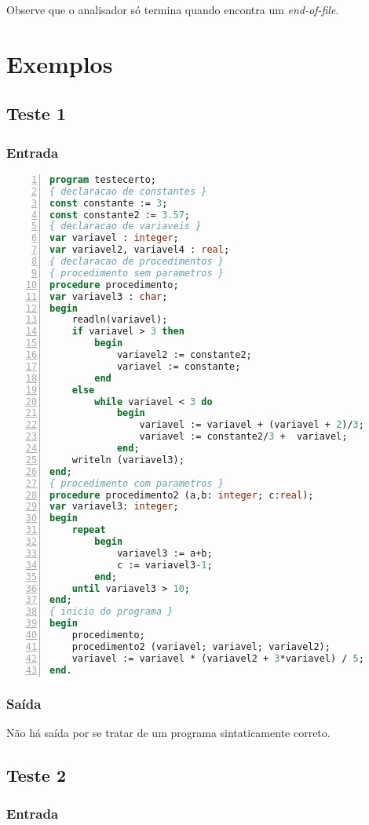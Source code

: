 \documentclass {article}
\begin{document}
	Observe que o analisador só termina quando encontra um \emph{end-of-file}.

	
\section{Exemplos}\label{section:exemplos}
	
	\subsection{Teste 1}
	\subsubsection*{Entrada}

	\begin{lstlisting}[language=Pascal,numbers=left,frame=top,frame=bottom]
program testecerto;
{ declaracao de constantes }
const constante := 3;
const constante2 := 3.57;
{ declaracao de variaveis }
var variavel : integer;
var variavel2, variavel4 : real;
{ declaracao de procedimentos }
{ procedimento sem parametros }
procedure procedimento;
var variavel3 : char;
begin
	readln(variavel);
	if variavel > 3 then
		begin
			variavel2 := constante2;
			variavel := constante;
		end
	else
		while variavel < 3 do
			begin
				variavel := variavel + (variavel + 2)/3;
				variavel := constante2/3 +  variavel;
			end;
	writeln (variavel3);
end;
{ procedimento com parametros }
procedure procedimento2 (a,b: integer; c:real);
var variavel3: integer;
begin
	repeat
		begin
			variavel3 := a+b;
			c := variavel3-1;
		end;
	until variavel3 > 10;
end;
{ inicio do programa }
begin
	procedimento;
	procedimento2 (variavel; variavel; variavel2);
	variavel := variavel * (variavel2 + 3*variavel) / 5;
end.
	\end{lstlisting}
	\subsubsection*{Saída}
		Não há saída por se tratar de um programa sintaticamente correto.

	\subsection{Teste 2}
	\subsubsection*{Entrada}
\end{document}
